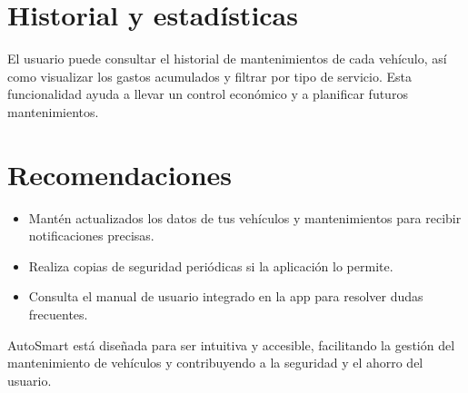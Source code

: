 \section{Historial y estadísticas}
El usuario puede consultar el historial de mantenimientos de cada vehículo, así como visualizar los gastos acumulados y filtrar por tipo de servicio. Esta funcionalidad ayuda a llevar un control económico y a planificar futuros mantenimientos.

\section{Recomendaciones}
\begin{itemize}
    \item Mantén actualizados los datos de tus vehículos y mantenimientos para recibir notificaciones precisas.
    \item Realiza copias de seguridad periódicas si la aplicación lo permite.
    \item Consulta el manual de usuario integrado en la app para resolver dudas frecuentes.
\end{itemize}

AutoSmart está diseñada para ser intuitiva y accesible, facilitando la gestión del mantenimiento de vehículos y contribuyendo a la seguridad y el ahorro del usuario. 